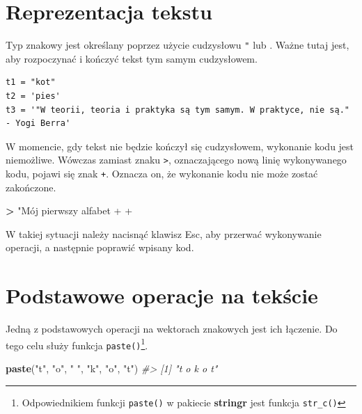 \documentclass[paper=6in:9in,pagesize=pdftex,headinclude=on,footinclude=on,10pt]{scrbook}
\newenvironment{Shaded}{\begin{snugshade}}{\end{snugshade}}
\newcommand{\CommentTok}[1]{\textcolor[rgb]{0.56,0.35,0.01}{\textit{#1}}}
\newcommand{\KeywordTok}[1]{\textcolor[rgb]{0.13,0.29,0.53}{\textbf{#1}}}
\newcommand{\NormalTok}[1]{#1}
\newcommand{\OperatorTok}[1]{\textcolor[rgb]{0.81,0.36,0.00}{\textbf{#1}}}
\newcommand{\StringTok}[1]{\textcolor[rgb]{0.31,0.60,0.02}{#1}}
\begin{document}
\hypertarget{reprezentacja-tekstu}{%
\section{Reprezentacja tekstu}\label{reprezentacja-tekstu}}

Typ znakowy jest określany poprzez użycie cudzysłowu \texttt{"} lub \texttt{\textquotesingle{}}.
Ważne tutaj jest, aby rozpoczynać i kończyć tekst tym samym cudzysłowem.

\begin{verbatim}
t1 = "kot"
t2 = 'pies'
t3 = '"W teorii, teoria i praktyka są tym samym. W praktyce, nie są." - Yogi Berra'
\end{verbatim}

W momencie, gdy tekst nie będzie kończył się cudzysłowem, wykonanie kodu jest niemożliwe.
Wówczas zamiast znaku \texttt{\textgreater{}}, oznaczającego nową linię wykonywanego kodu, pojawi się znak \texttt{+}.
Oznacza on, że wykonanie kodu nie może zostać zakończone.

\begin{Shaded}
\begin{Highlighting}[]
\OperatorTok{>}\StringTok{ "Mój pierwszy alfabet}
\StringTok{+}
\StringTok{+}
\end{Highlighting}
\end{Shaded}

W takiej sytuacji należy nacisnąć klawisz Esc, aby przerwać wykonywanie operacji, a następnie poprawić wpisany kod.

\hypertarget{podstawowe-operacje-na-tekux15bcie}{%
\section{Podstawowe operacje na tekście}\label{podstawowe-operacje-na-tekux15bcie}}

Jedną z podstawowych operacji na wektorach znakowych jest ich łączenie.
Do tego celu służy funkcja \texttt{paste()}\footnote{Odpowiednikiem funkcji \texttt{paste()} w pakiecie \textbf{stringr} jest funkcja \texttt{str\_c()}}.

\begin{Shaded}
\begin{Highlighting}[]
\KeywordTok{paste}\NormalTok{(}\StringTok{"t"}\NormalTok{, }\StringTok{"o"}\NormalTok{, }\StringTok{" "}\NormalTok{, }\StringTok{"k"}\NormalTok{, }\StringTok{"o"}\NormalTok{, }\StringTok{"t"}\NormalTok{)}
\CommentTok{#> [1] "t o   k o t"}
\end{Highlighting}
\end{Shaded}
\end{document}
